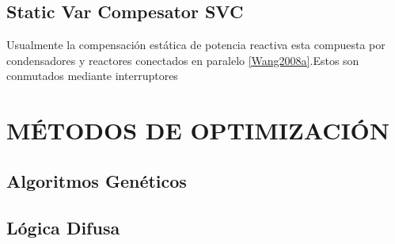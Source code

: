 \documentclass[12pt, letterpaper]{report}
\begin{document}
\subsection{Static Var Compesator SVC}
Usualmente la compensación estática de potencia reactiva esta compuesta por condensadores y reactores conectados en paralelo \ref{Wang2008a}.Estos son conmutados mediante interruptores 

\section{MÉTODOS DE OPTIMIZACIÓN}
\subsection{Algoritmos Genéticos}


\subsection{Lógica Difusa}
\end{document}
